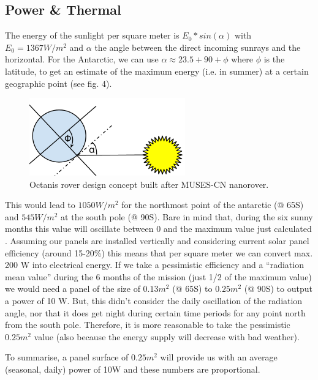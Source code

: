 \documentclass[a4paper,12pt]{article}
\begin{document}
\subsection{Power \& Thermal}

The energy of the sunlight per square meter is $E_0*sin(\alpha)$ with $E_0=1367 W/m^2$ and $\alpha$ the angle between the direct incoming sunrays and the horizontal. For the Antarctic, we can use $\alpha \approx 23.5+90+\phi$ where $\phi$ is the latitude, to get an estimate of the maximum energy (i.e. in summer) at a certain geographic point (see fig. 4).


\begin{figure}[h!]
	\centering
    \includegraphics[width=0.6\textwidth]{sun}
    \caption{Octanis rover design concept built after MUSES-CN nanorover.}
\end{figure}


 This would lead to $1050 W/m^2$ for the northmost point of the antarctic (@ 65\degree S) and $545 W/m^2$ at the south pole (@ 90\degree S). Bare in mind that, during the six sunny months this value will oscillate between 0 and the maximum value just calculated \cite{pvedu}. 
Assuming our panels are installed vertically and considering current solar panel efficiency (around 15-20\%) this means that per square meter we can convert max. 200 W into electrical energy. If we take a pessimistic efficiency and a “radiation mean value” during the 6 months of the mission (just 1/2 of the maximum value) we would need a panel of the size of $0.13m^2$ (@ 65\degree S) to $0.25m^2$ (@ 90\degree S) to output a power of 10 W. But, this didn’t consider the daily oscillation of the radiation angle, nor that it does get night during certain time periods for any point north from the south pole. Therefore, it is more reasonable to take the pessimistic $0.25m^2$ value (also because the energy supply will decrease with bad weather).

To summarise, a panel surface of $0.25m^2$ will provide us with an average (seasonal, daily) power of 10W and these numbers are proportional. 
\end{document}
